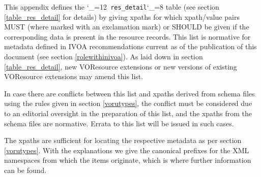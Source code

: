 \documentclass[11pt,a4paper]{ivoa}
\makeatletter
\def\rtent#1{\texttt{\color{rtcolor}\verb|#1|}}
\def\makeunderscoreletter{\catcode`\_=12}
\def\makeunderscoresubscript{\catcode`\_=8}
\def\rtent{\makeunderscoreletter\relax\rt@nt}
\def\rt@nt#1{\texttt{\color{rtcolor} #1}\makeunderscoresubscript{}}
\makeatother
\begin{document}
This appendix defines the \rtent{res_detail}
table (see section \ref{table_res_detail} for
details) by giving
xpaths for which xpath/value pairs MUST (where marked with an
exclamation mark) or SHOULD be given if the
corresponding data is present in the resource records.  This list is
normative for metadata defined in IVOA recommendations current as of the
publication of this document (see section \ref{rolewithinivoa}).
As laid down in section \ref{table_res_detail},
new VOResource extensions or new
versions of existing VOResource extensions may amend this list.

In case there are conflicts between this list and xpaths derived
from schema files using the rules given in section \ref{vorutypes}, the conflict must be considered due to an
editorial oversight in the preparation of this list, and the xpaths from the
schema files are normative.  Errata to this list will be issued in such
cases.

The xpaths are sufficient for locating the respective metadata as per
section \ref{vorutypes}.  With the explanations we
give the canonical prefixes for the XML namespaces from which the items
originate, which is where further information can be found.
\end{document}
